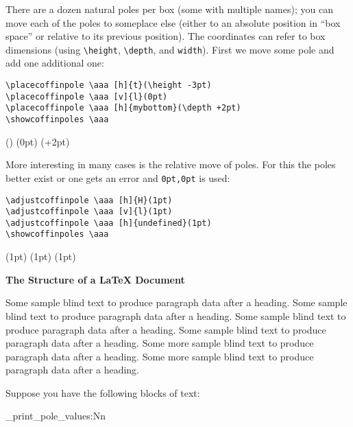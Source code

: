 \documentclass{article}
\newcommand\cbox[2][.8]{{\setlength\fboxsep{0pt}\colorbox[gray]{#1}{#2}}}
\begin{document}
There are a dozen natural poles per box (some with multiple names); you can
move each of the poles to someplace else (either to an absolute position in
``box space'' or relative to its previous position).  The coordinates can
refer to box dimensions (using \verb|\height|, \verb|\depth|,
 and \verb|width|). First we move some pole and add one
additional one:
\begin{verbatim}
\placecoffinpole \aaa [h]{t}(\height -3pt)
\placecoffinpole \aaa [v]{l}(0pt)
\placecoffinpole \aaa [h]{mybottom}(\depth +2pt)
\showcoffinpoles \aaa
\end{verbatim}
\placecoffinpole {}(\height -3pt)
\placecoffinpole {}(0pt)
\placecoffinpole {}(\depth +2pt)
\showcoffinpoles \aaa


More interesting in many cases is the relative move of poles. For this the
poles better exist or one gets an error and \texttt{0pt,0pt} is used:
\begin{verbatim}
\adjustcoffinpole \aaa [h]{H}(1pt)
\adjustcoffinpole \aaa [v]{l}(1pt)
\adjustcoffinpole \aaa [h]{undefined}(1pt)
\showcoffinpoles \aaa
\end{verbatim}
\adjustcoffinpole {}(1pt)
\adjustcoffinpole {}(1pt)
\adjustcoffinpole {}(1pt)
\showcoffinpoles \aaa



\sbox {}

\setvcoffin \bbb {11cm}
   {\raggedleft\normalfont\fontsize{36}{38pt}\bfseries 
    The Structure of a \LaTeX{} Document}

\setvcoffin \ccc {13cm}
   {Some sample blind text to produce paragraph data after a heading.
    Some sample blind text to produce paragraph data after a heading.
    Some sample blind text to produce paragraph data after a heading.
    Some sample blind text to produce paragraph data after a heading.
    \endgraf
    Some more sample blind text to produce paragraph data after a heading.
    Some more sample blind text to produce paragraph data after a heading.
}


Suppose you have the following blocks of text:

\bigskip

\noindent\cbox{\usebox\aaa}

\errorstopmode

\begin{multicols}{2}
\ttfamily\tiny
\ExplSyntaxOn
   \noindent \coffin_print_pole_values:Nn \aaa \\ 
\ExplSyntaxOff
\end{multicols}
\end{document}
